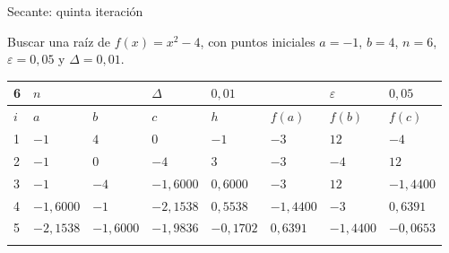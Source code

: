 \documentclass[main.tex]{subfiles}
\begin{document}
\begin{frame}[t]{Secante: quinta iteración}
\begin{minipage}[t][13mm][t]{\textwidth}\small Buscar una raíz de $f(x)=x^2-4$, con puntos iniciales $a=-1$, $b=4$, $n=6$, $\varepsilon=0{,}05$ y $\Delta=0{,}01$.\end{minipage}\par{\scriptsize\setlength{\tabcolsep}{2pt}\renewcommand{\arraystretch}{1}\begin{center}\begin{tabular}{|C{.04\textwidth}|C{.112\textwidth}|C{.112\textwidth}|C{.112\textwidth}|C{.112\textwidth}|C{.112\textwidth}|C{.112\textwidth}|C{.112\textwidth}|}
\hline
\rule{0pt}{4.3mm}6 & $n$ &  &  $\Delta$  & $0{,}01$ &  & $\varepsilon$ & $0{,}05$\\\hline
\rule{0pt}{4.3mm}$i$ & $a$ & $b$ & $c$ & $h$ & $f(a)$ & $f(b)$ & $f(c)$\\\hline
\rule{0pt}{4.3mm}1 & $-1$ & $4$ & $0$ & $-1$ & $-3$ & $12$ & $-4$\\\hline
\rule{0pt}{4.3mm}2 & $-1$ & $0$ & $-4$ & $3$ & $-3$ & $-4$ & $12$\\\hline
\rule{0pt}{4.3mm}3 & $-1$ & $-4$ & $-1{,}6000$ & $0{,}6000$ & $-3$ & $12$ & $-1{,}4400$\\\hline
\rule{0pt}{4.3mm}4 & $-1{,}6000$ & $-1$ & $-2{,}1538$ & $0{,}5538$ & $-1{,}4400$ & $-3$ & $0{,}6391$\\\hline
\rule{0pt}{4.3mm}5 & $-2{,}1538$ & $-1{,}6000$ & $-1{,}9836$ & $-0{,}1702$ & $0{,}6391$ & $-1{,}4400$ & $-0{,}0653$\\\hline
\rule{0pt}{4.3mm} &  &  &  &  &  &  & \\\hline
\end{tabular}\end{center}}\begin{minipage}[t][10mm][t]{\textwidth}\footnotesize \end{minipage}
\end{frame}
\end{document}
